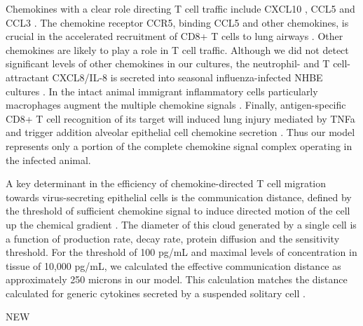 \documentclass[10pt]{article}
\begin{document}
Chemokines with a clear role directing T cell traffic include CXCL10 \cite{Dufour2002}, CCL5 \cite{Kawai1999} and CCL3 \cite{Kawai1999}.  The chemokine receptor CCR5, binding CCL5 and other chemokines, is crucial in the accelerated recruitment of CD8+ T cells to lung airways \cite{Kohlmeier2008}.  Other chemokines are likely to play a role in T cell traffic.  Although we did not detect significant levels of other chemokines in our cultures, the neutrophil- and T cell-attractant CXCL8/IL-8 is secreted into seasonal influenza-infected NHBE cultures \cite{Matsukura1996, Arndt2002}.  In the intact animal immigrant inflammatory cells particularly macrophages augment the multiple chemokine signals \cite{Julkunen2000}.  Finally, antigen-specific CD8+ T cell recognition of its target will induced lung injury mediated by TNFa and trigger addition alveolar epithelial cell chemokine secretion \cite{Zhao2000}.   Thus our model represents only a portion of the complete chemokine signal complex operating in the infected animal.

A key determinant in the efficiency of chemokine-directed T cell migration towards virus-secreting epithelial cells is the communication distance, defined by the threshold of sufficient chemokine signal to induce directed motion of the cell up the chemical gradient \cite{Thelen2008}.  The diameter of this cloud generated by a single cell is a function of production rate, decay rate, protein diffusion and the sensitivity threshold.  For the threshold of 100 pg/mL and maximal levels of concentration in tissue of 10,000 pg/mL, we calculated the effective communication distance as approximately 250 microns in our model.  This calculation matches the distance calculated for generic cytokines secreted by a suspended solitary cell \cite{Francis1997}.

NEW
\end{document}
